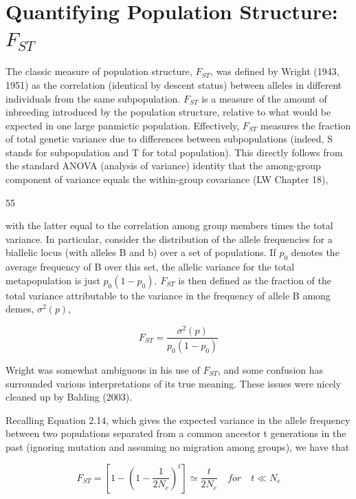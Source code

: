 \documentclass{article}
\begin{document}
\section{Quantifying Population Structure:  $ F_{ST} $}
The classic measure of population structure,  $ F_{ST} $, was defined by Wright (1943, 1951) as the correlation (identical by descent status) between alleles in different individuals from the same subpopulation.  $ F_{ST} $ is a measure of the amount of inbreeding introduced by the population structure, relative to what would be expected in one large panmictic population. Effectively,  $ F_{ST} $ measures the fraction of total genetic variance due to differences between subpopulations (indeed, S stands for subpopulation and T for total population). This directly follows from the standard ANOVA (analysis of variance) identity that the among-group component of variance equals the within-group covariance (LW Chapter 18),

55

with the latter equal to the correlation among group members times the total variance. In particular, consider the distribution of the allele frequencies for a biallelic locus (with alleles B and b) over a set of populations. If  $ p_0 $ denotes the average frequency of B over this set, the allelic variance for the total metapopulation is just  $ p_0(1 - p_0) $.  $ F_{ST} $ is then defined as the fraction of the total variance attributable to the variance in the frequency of allele B among demes,  $ \sigma^2(p) $,

\begin{equation}
F_{ST}=\frac{\sigma^{2}(p)}{p_{0}(1-p_{0})}
\tag{2.42}
\label{eq:2_42}
\end{equation}

Wright was somewhat ambiguous in his use of  $ F_{ST} $, and some confusion has surrounded various interpretations of its true meaning. These issues were nicely cleaned up by Balding (2003).

Recalling Equation 2.14, which gives the expected variance in the allele frequency between two populations separated from a common ancestor t generations in the past (ignoring mutation and assuming no migration among groups), we have that

\begin{equation}
F_{ST}=\left[1-\left(1-\frac{1}{2N_{e}}\right)^{t}\right]\simeq\frac{t}{2N_{e}}\quad for\quad t\ll N_{e}
\tag{2.43}
\label{eq:2_43}
\end{equation}
\end{document}
